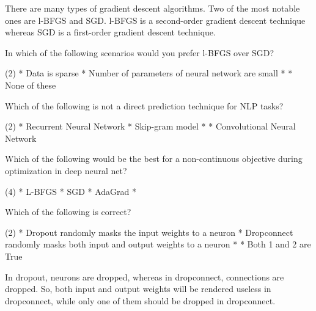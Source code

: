 \documentclass[10pt]{extarticle}
\begin{document}
\begin{exercise}
    There are many types of gradient descent algorithms. Two of the most notable ones are l-BFGS and SGD. l-BFGS is a second-order gradient descent technique whereas SGD is a first-order gradient descent technique.
    
    \noindent In which of the following scenarios would you prefer l-BFGS over SGD?
    \begin{choice} (2)
        * Data is sparse
        * Number of parameters of neural network are small
        * 
        * None of these
    \end{choice}
\end{exercise}
\begin{solution}
\end{solution}

\begin{exercise}
    Which of the following is not a direct prediction technique for NLP tasks?
    \begin{choice} (2)
        * Recurrent Neural Network
        * Skip-gram model
        *
        * Convolutional Neural Network
    \end{choice}
\end{exercise}
\begin{solution}
\end{solution}

\begin{exercise}
    Which of the following would be the best for a non-continuous objective during optimization in deep neural net?
    \begin{choice} (4)
        * L-BFGS
        * SGD
        * AdaGrad
        *
    \end{choice}
\end{exercise}
\begin{solution}
\end{solution}

\begin{exercise}
    Which of the following is correct?
    \begin{choice} (2)
        * Dropout randomly masks the input weights to a neuron
        * Dropconnect randomly masks both input and output weights to a neuron
        *
        * Both 1 and 2 are True
    \end{choice}
\end{exercise}
\begin{solution}
    In dropout, neurons are dropped, whereas in dropconnect, connections are dropped. So, both input and output weights will be rendered useless in dropconnect, while only one of them should be dropped in dropconnect.
\end{solution}
\end{document}
